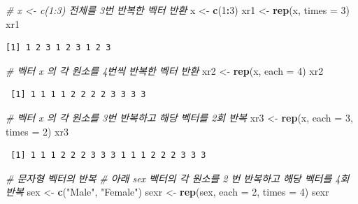 \documentclass[
  11pt,
]{krantz}
\newenvironment{Shaded}{\begin{snugshade}}{\end{snugshade}}
\newcommand{\CommentTok}[1]{\textcolor[rgb]{0.37,0.37,0.37}{\textit{#1}}}
\newcommand{\DataTypeTok}[1]{\textcolor[rgb]{0.27,0.27,0.27}{#1}}
\newcommand{\DecValTok}[1]{\textcolor[rgb]{0.06,0.06,0.06}{#1}}
\newcommand{\KeywordTok}[1]{\textcolor[rgb]{0.27,0.27,0.27}{\textbf{#1}}}
\newcommand{\NormalTok}[1]{#1}
\newcommand{\OperatorTok}[1]{\textcolor[rgb]{0.43,0.43,0.43}{\textbf{#1}}}
\newcommand{\StringTok}[1]{\textcolor[rgb]{0.5,0.5,0.5}{#1}}
\begin{document}
\begin{Shaded}
\begin{Highlighting}[]
\CommentTok{# x <- c(1:3) 전체를 3번 반복한 벡터 반환}
\NormalTok{x <-}\StringTok{ }\KeywordTok{c}\NormalTok{(}\DecValTok{1}\OperatorTok{:}\DecValTok{3}\NormalTok{)}
\NormalTok{xr1 <-}\StringTok{ }\KeywordTok{rep}\NormalTok{(x, }\DataTypeTok{times =} \DecValTok{3}\NormalTok{)}
\NormalTok{xr1}
\end{Highlighting}
\end{Shaded}

\begin{verbatim}
[1] 1 2 3 1 2 3 1 2 3
\end{verbatim}

\begin{Shaded}
\begin{Highlighting}[]
\CommentTok{# 벡터 x 의 각 원소를 4번씩 반복한 벡터 반환}
\NormalTok{xr2 <-}\StringTok{ }\KeywordTok{rep}\NormalTok{(x, }\DataTypeTok{each =} \DecValTok{4}\NormalTok{)}
\NormalTok{xr2}
\end{Highlighting}
\end{Shaded}

\begin{verbatim}
 [1] 1 1 1 1 2 2 2 2 3 3 3 3
\end{verbatim}

\begin{Shaded}
\begin{Highlighting}[]
\CommentTok{# 벡터 x 의 각 원소를 3번 반복하고 해당 벡터를 2회 반복}
\NormalTok{xr3 <-}\StringTok{ }\KeywordTok{rep}\NormalTok{(x, }\DataTypeTok{each =} \DecValTok{3}\NormalTok{, }\DataTypeTok{times =} \DecValTok{2}\NormalTok{)}
\NormalTok{xr3}
\end{Highlighting}
\end{Shaded}

\begin{verbatim}
 [1] 1 1 1 2 2 2 3 3 3 1 1 1 2 2 2 3 3 3
\end{verbatim}

\begin{Shaded}
\begin{Highlighting}[]
\CommentTok{# 문자형 벡터의 반복}
\CommentTok{# 아래 sex 벡터의 각 원소를 2 번 반복하고 해당 벡터를 4회 반복}
\NormalTok{sex <-}\StringTok{ }\KeywordTok{c}\NormalTok{(}\StringTok{"Male"}\NormalTok{, }\StringTok{"Female"}\NormalTok{)}
\NormalTok{sexr <-}\StringTok{ }\KeywordTok{rep}\NormalTok{(sex, }\DataTypeTok{each =} \DecValTok{2}\NormalTok{, }\DataTypeTok{times =} \DecValTok{4}\NormalTok{)}
\NormalTok{sexr}
\end{Highlighting}
\end{Shaded}
\end{document}

